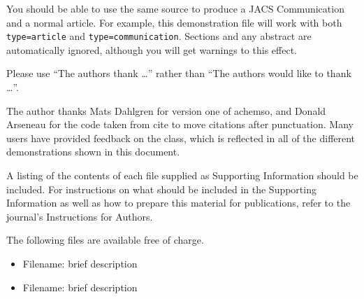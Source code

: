 You should be able to use the same source to produce a JACS
Communication and a normal article.  For example, this demonstration
file will work with both \texttt{type=article} and
\texttt{type=communication}. Sections and any abstract are
automatically ignored, although you will get warnings to this effect.

\begin{acknowledgement}

Please use ``The authors thank \ldots'' rather than ``The
authors would like to thank \ldots''.

The author thanks Mats Dahlgren for version one of \textsf{achemso},
and Donald Arseneau for the code taken from \textsf{cite} to move
citations after punctuation. Many users have provided feedback on the
class, which is reflected in all of the different demonstrations
shown in this document.

\end{acknowledgement}

\begin{suppinfo}

A listing of the contents of each file supplied as Supporting Information
should be included. For instructions on what should be included in the
Supporting Information as well as how to prepare this material for
publications, refer to the journal's Instructions for Authors.

The following files are available free of charge.
\begin{itemize}
  \item Filename: brief description
  \item Filename: brief description
\end{itemize}

\end{suppinfo}



